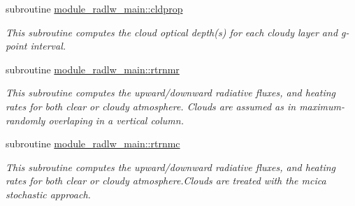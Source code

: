 {\bf }\par
\begin{DoxyCompactItemize}
\item 
subroutine \hyperlink{namespacemodule__radlw__main_a8fb170c933c1644e03d8aaba2451ee0f}{module\+\_\+radlw\+\_\+main\+::cldprop}                                                                                             
\begin{DoxyCompactList}\small\item\em This subroutine computes the cloud optical depth(s) for each cloudy layer and g-\/point interval. \end{DoxyCompactList}\end{DoxyCompactItemize}

{\bf }\par
\begin{DoxyCompactItemize}
\item 
subroutine \hyperlink{namespacemodule__radlw__main_ad8f07b8a0e3dfa639b970d756824b9d3}{module\+\_\+radlw\+\_\+main\+::rtrnmr}                                                                                               
\begin{DoxyCompactList}\small\item\em This subroutine computes the upward/downward radiative fluxes, and heating rates for both clear or cloudy atmosphere. Clouds are assumed as in maximum-\/randomly overlaping in a vertical column. \end{DoxyCompactList}\end{DoxyCompactItemize}

{\bf }\par
\begin{DoxyCompactItemize}
\item 
subroutine \hyperlink{namespacemodule__radlw__main_a51d42f46321972ffdca4880185506ac5}{module\+\_\+radlw\+\_\+main\+::rtrnmc}                                                                                               
\begin{DoxyCompactList}\small\item\em This subroutine computes the upward/downward radiative fluxes, and heating rates for both clear or cloudy atmosphere.\+Clouds are treated with the mcica stochastic approach. \end{DoxyCompactList}\end{DoxyCompactItemize}

